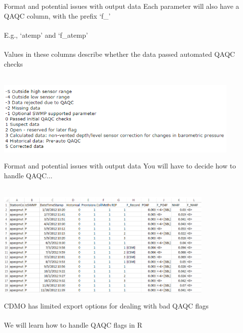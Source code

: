 \documentclass[xcolor=svgnames]{beamer}\usepackage[]{graphicx}\usepackage[]{color}
\begin{document}
\begin{frame}{Format and potential issues with output data}
Each parameter will also have a QAQC column, with the prefix `f\_' \\~\\
E.g., `atemp' and `f\_atemp' \\~\\
Values in these columns describe whether the data passed automated QAQC checks \\~\\
\centerline{\includegraphics[width = 0.9\textwidth]{qaqc_flags.png}}
\end{frame}

\begin{frame}{Format and potential issues with output data}
You will have to decide how to handle QAQC...\\~\\
\centerline{\includegraphics[width = 0.8\textwidth]{qaqc_ex.png}}
\vspace{0.2in}
CDMO has limited export options for dealing with bad QAQC flags \\~\\
We will learn how to handle QAQC flags in R
\end{frame}
\end{document}
